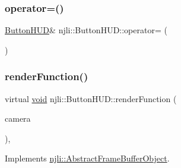 \mbox{\label{classnjli_1_1_button_h_u_d_a4dec6cd3d342055256adf12caa8fd089}} 
\subsubsection{\texorpdfstring{operator=()}{operator=()}}
{\footnotesize\ttfamily \mbox{\hyperlink{classnjli_1_1_button_h_u_d}{Button\+H\+UD}}\& njli\+::\+Button\+H\+U\+D\+::operator= (\begin{DoxyParamCaption}\item[{const \mbox{\hyperlink{classnjli_1_1_button_h_u_d}{Button\+H\+UD}} \&}]{ }\end{DoxyParamCaption})\hspace{0.3cm}{\ttfamily [protected]}}

\mbox{\label{classnjli_1_1_button_h_u_d_add44501f95991324e5733c8bfc18f166}} 
\subsubsection{\texorpdfstring{render\+Function()}{renderFunction()}}
{\footnotesize\ttfamily virtual \mbox{\hyperlink{_thread_8h_af1e856da2e658414cb2456cb6f7ebc66}{void}} njli\+::\+Button\+H\+U\+D\+::render\+Function (\begin{DoxyParamCaption}\item[{\mbox{\hyperlink{classnjli_1_1_camera}{Camera}} $\ast$}]{camera }\end{DoxyParamCaption})\hspace{0.3cm}{\ttfamily [protected]}, {\ttfamily [virtual]}}



Implements \mbox{\hyperlink{classnjli_1_1_abstract_frame_buffer_object_aa75a537f5745e4be8f749892d195b43c}{njli\+::\+Abstract\+Frame\+Buffer\+Object}}.

\mbox{\label{classnjli_1_1_button_h_u_d_a35bd5342f1ac5ea121d50f0a4c4b9981}} 

